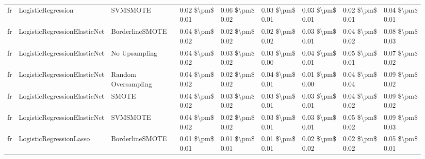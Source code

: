 \begin{tabular}{lllllllll}
      fr &              LogisticRegression &                      SVMSMOTE & 0.02 \$\textbackslash pm\$ 0.01 &           0.06 \$\textbackslash pm\$ 0.02 &       0.03 \$\textbackslash pm\$ 0.01 &        0.03 \$\textbackslash pm\$ 0.01 &                         0.02 \$\textbackslash pm\$ 0.01 &     0.04 \$\textbackslash pm\$ 0.01 \\
      fr &    LogisticRegressionElasticNet &               BorderlineSMOTE & 0.04 \$\textbackslash pm\$ 0.02 &           0.02 \$\textbackslash pm\$ 0.02 &       0.02 \$\textbackslash pm\$ 0.02 &        0.03 \$\textbackslash pm\$ 0.01 &                         0.04 \$\textbackslash pm\$ 0.02 &     0.08 \$\textbackslash pm\$ 0.03 \\
      fr &    LogisticRegressionElasticNet &                 No Upsampling & 0.04 \$\textbackslash pm\$ 0.02 &           0.03 \$\textbackslash pm\$ 0.02 &       0.03 \$\textbackslash pm\$ 0.00 &        0.04 \$\textbackslash pm\$ 0.01 &                         0.05 \$\textbackslash pm\$ 0.01 &     0.07 \$\textbackslash pm\$ 0.02 \\
      fr &    LogisticRegressionElasticNet &           Random Oversampling & 0.04 \$\textbackslash pm\$ 0.02 &           0.02 \$\textbackslash pm\$ 0.02 &       0.04 \$\textbackslash pm\$ 0.01 &        0.01 \$\textbackslash pm\$ 0.00 &                         0.04 \$\textbackslash pm\$ 0.04 &     0.09 \$\textbackslash pm\$ 0.02 \\
      fr &    LogisticRegressionElasticNet &                         SMOTE & 0.04 \$\textbackslash pm\$ 0.02 &           0.03 \$\textbackslash pm\$ 0.02 &       0.03 \$\textbackslash pm\$ 0.01 &        0.03 \$\textbackslash pm\$ 0.01 &                         0.04 \$\textbackslash pm\$ 0.02 &     0.09 \$\textbackslash pm\$ 0.02 \\
      fr &    LogisticRegressionElasticNet &                      SVMSMOTE & 0.04 \$\textbackslash pm\$ 0.02 &           0.02 \$\textbackslash pm\$ 0.02 &       0.03 \$\textbackslash pm\$ 0.01 &        0.03 \$\textbackslash pm\$ 0.01 &                         0.05 \$\textbackslash pm\$ 0.02 &     0.09 \$\textbackslash pm\$ 0.03 \\
      fr &         LogisticRegressionLasso &               BorderlineSMOTE & 0.01 \$\textbackslash pm\$ 0.01 &           0.01 \$\textbackslash pm\$ 0.01 &       0.01 \$\textbackslash pm\$ 0.01 &        0.02 \$\textbackslash pm\$ 0.02 &                         0.02 \$\textbackslash pm\$ 0.02 &     0.05 \$\textbackslash pm\$ 0.01 \\

\end{tabular}
